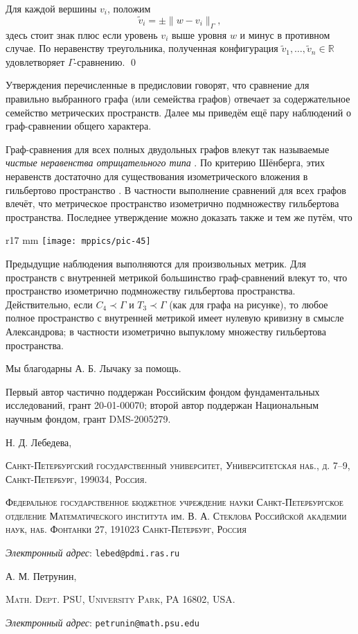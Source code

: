 \documentclass{article}
\makeatletter
\newcommand{\Addresses}{{\bigskip\footnotesize

\noindent Н. Д. Лебедева,
\par\nopagebreak
 \textsc{Санкт-Петербургский государственный университет, Университетская наб., д. 7–9, Санкт-Петербург, 199034, Россия.}
\par
\nopagebreak
 \textsc{Федеральное  государственное  бюджетное  учреждение  науки
Санкт-Петербургское  отделение  Математического  института
им. В. А. Стеклова  Российской  академии  наук, наб. Фонтанки 27,
191023 Санкт-Петербург,
Россия }
  \par\nopagebreak
  \textit{Электронный адрес}: \texttt{lebed@pdmi.ras.ru}

\medskip

\noindent   А. М. Петрунин, 
\par\nopagebreak
 \textsc{Math. Dept. PSU, University Park, PA 16802, USA.}
  \par\nopagebreak
  \textit{Электронный адрес}: \texttt{petrunin@math.psu.edu}
  
}}
\def\parbf#1{\medskip\noindent{\bf #1}}
\def\qeds{\qed\par\medskip}
\makeatother
\begin{document}
Для каждой вершины $v_i$, положим
\[\tilde v_i=\pm \|w-v_i\|_\Gamma,\]
здесь стоит знак плюс если уровень $v_i$ выше уровня $w$ и минус в противном случае.
По неравенству треугольника, полученная конфигурация $\tilde v_1,\dots,\tilde v_n\in\mathbb{R}$ удовлетворяет $\Gamma$-сравнению.
\qeds

\parbf{Замечания.}
Утверждения перечисленные в предисловии говорят, что сравнение для правильно выбранного графа (или семейства графов) отвечает за содержательное семейство метрических пространств.
Далее мы приведём ещё пару наблюдений о граф-сравнении общего характера.

Граф-сравнения для всех полных двудольных графов влекут так называемые \emph{чистые неравенства отрицательного типа} \cite[6.1.1]{deza-laurent-ru}.
По критерию Шёнберга, этих неравенств достаточно для существования изометрического вложения в гильбертово пространство \cite[6.2.1]{deza-laurent}.
В частности выполнение сравнений для всех графов влечёт, что метрическое пространство изометрично подмножеству гильбертова пространства.
Последнее утверждение можно доказать также и тем же путём, что \cite[Prop. 1.9]{toyoda}


\begin{wrapfigure}{r}{17 mm}
\vskip-6mm
\centering
\texttt{[image: mppics/pic-45]}
\vskip-2mm
\end{wrapfigure}

Предыдущие наблюдения выполняются для произвольных метрик.
Для пространств с внутренней метрикой большинство граф-сравнений влекут то, что пространство изометрично подмножеству гильбертова пространства.
Действительно, если $C_4\prec\Gamma$ и $T_3\prec\Gamma$ (как для графа на рисунке),
то любое полное пространство с внутренней метрикой имеет нулевую кривизну в смысле Александрова; 
в частности изометрично выпуклому множеству гильбертова пространства.

\parbf{Благодарности.}
Мы благодарны А. Б. Лычаку за помощь. 

Первый автор частично поддержан Российским фондом фундаментальных исследований, грант 20-01-00070;
второй автор поддержан Национальным научным фондом, грант DMS-2005279.

{\sloppy
\printbibliography[heading=bibintoc]
\fussy
}

\Addresses
\end{document}
